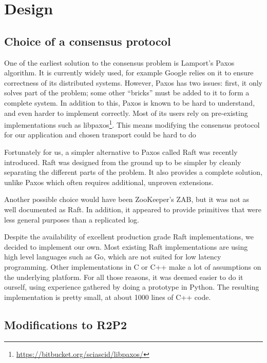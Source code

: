\chapter{Design}
\label{chap:design}

\section{Choice of a consensus protocol}

One of the earliest solution to the consensus problem is Lamport's Paxos algorithm\cite{paxos}.
It is currently widely used, for example Google relies on it to ensure correctness of its distributed systems\cite{chubby, paxoslive}.
However, Paxos has two issues: first, it only solves part of the problem; some other ``bricks'' must be added to it to form a complete system.
In addition to this, Paxos is known to be hard to understand, and even harder to implement correctly.
Most of its users rely on pre-existing implementations such as libpaxos\footnote{\url{https://bitbucket.org/sciascid/libpaxos/}}.
This means modifying the consensus protocol for our application and chosen transport could be hard to do

Fortunately for us, a simpler alternative to Paxos called Raft was recently introduced\cite{raft}.
Raft was designed from the ground up to be simpler by cleanly separating the different parts of the problem.
It also provides a complete solution, unlike Paxos which often requires additional, unproven extensions\cite{paxoslive}.

Another possible choice would have been ZooKeeper's ZAB\cite{zookeeper}, but it was not as well documented as Raft.
In addition, it appeared to provide primitives that were less general purposes than a replicated log.

Despite the availability of excellent production grade Raft implementations, we decided to implement our own.
Most existing Raft implementations are using high level languages such as Go, which are not suited for low latency programming.
Other implementations in C or C++ make a lot of assumptions on the underlying platform.
For all those reasons, it was deemed easier to do it ourself, using experience gathered by doing a prototype in Python.
The resulting implementation is pretty small, at about 1000 lines of C++ code.

\section{Modifications to R2P2}


